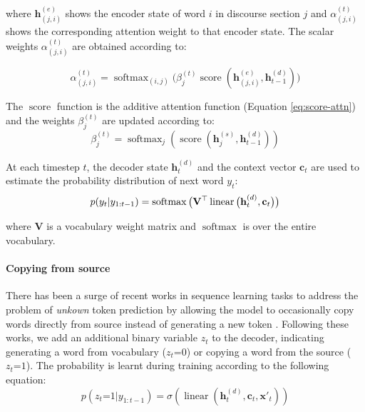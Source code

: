 \documentclass[11pt,a4paper]{article}
\newcommand{\V}[1][\mathbf]{#1}
\newcommand{\I}[1][\textit]{#1}
\newcommand{\encstate}[1]{\mathbf{h}_{#1}^{(e)}}
\newcommand{\encstatesec}[1]{\mathbf{h}_{#1}^{(s)}}
\newcommand{\decstate}[1]{\mathbf{h}_{#1}^{(d)}}
\DeclareMathOperator{\linear}{linear}
\DeclareMathOperator{\softmax}{softmax}
\newcommand{\newsoftmax}{\mathop{\mathrm{softmax}}}
\DeclareMathOperator{\score}{score}
\def\Equal{\texttt{=}}
\begin{document}
\noindent where $\encstate{(j,i)}$ shows the encoder state of word $i$ in discourse section $j$ and $\alpha_{(j,i)}^{(t)}$ shows the corresponding attention weight to that encoder state. The scalar weights $\alpha_{(j,i)}^{(t)}$ are obtained according to:

\begin{equation} \alpha^{(t)}_{(j,i)} = \newsoftmax_{(i,j)} \Big( \beta^{(t)}_j \score(\encstate{(j,i)}, \decstate{t-1}) \Big) \label{eq:att-word}\end{equation}

\noindent The $\score$ function is the additive attention function (Equation \ref{eq:score-attn}) and the weights $\beta^{(t)}_j$ are updated according to:
\begin{equation}
\beta^{(t)}_{j} = \newsoftmax_j(\score(\encstatesec{j}, \decstate{t-1})) \label{eq:att-sec}
\end{equation}

At each timestep $t$, the decoder state $\decstate{t}$ and the context vector $\V{c}_t$ are used to estimate the probability distribution of next word $y_t$:
\begin{equation}
  \small
  \label{eq:final-softmax}
  p(y_t|y_{1:t-1}) = \softmax \big(\V{V}^\top \linear \big( \decstate{t}, \V{c}_t \big)\big)
\end{equation}


\noindent where $\V{V}$ is a vocabulary weight matrix and $\softmax$ is over the entire vocabulary.


\paragraph{Copying from source}

There has been a surge of recent works in sequence learning tasks to address the problem of \I{unkown} token prediction by allowing the model to occasionally copy words directly from source instead of generating a new token \cite{gu2016incorporating,see2017get,paulus2017deep,wiseman2017challenges}. Following these works, we add an additional binary variable $z_t$ to the decoder, indicating generating a word from vocabulary ($z_t\Equal0$) or copying a word from the source ($z_t\Equal1$). The probability is learnt during training according to the following equation:
\begin{equation} p(z_t\Equal1|y_{1:t-1})=\sigma(\linear(\decstate{t}, \V{c}_t, \V{x}'_t ))
\label{eq:switch} \end{equation}
\end{document}
